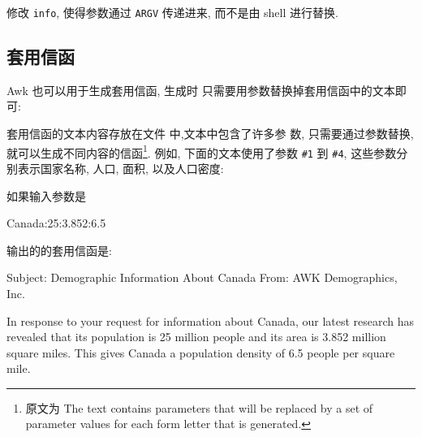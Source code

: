 \begin{exercise}
    修改 \texttt{info}, 使得参数通过 \texttt{ARGV} 传递进来, 而不是由 shell 
    进行替换.
\end{exercise}

\subsection{套用信函}
\label{subsec:form_letters}

Awk 也可以用于生成套用信函, 生成时
只需要用参数替换掉套用信函中的文本即可:
\begin{center}
\end{center}
套用信函的文本内容存放在文件  中,文本中包含了许多参
数, 只需要通过参数替换, 就可以生成不同内容的信函\footnote{原文为 The text
    contains parameters that will be replaced by a set of parameter values
for each form letter that is generated.}. 例如, 下面的文本使用了参数 
\verb'#1' 到 \verb'#4', 这些参数分别表示国家名称, 人口, 面积, 以及人口密度:

如果输入参数是
\begin{shell}
    Canada:25:3.852:6.5
\end{shell}
输出的的套用信函是:
\begin{shell}
    Subject: Demographic Information About Canada
    From: AWK Demographics, Inc.

    In response to your request for information about Canada,
    our latest research has revealed that its population is 25
    million people and its area is 3.852 million square miles.
    This gives Canada a population density of 6.5 people per
    square mile.
\end{shell}

